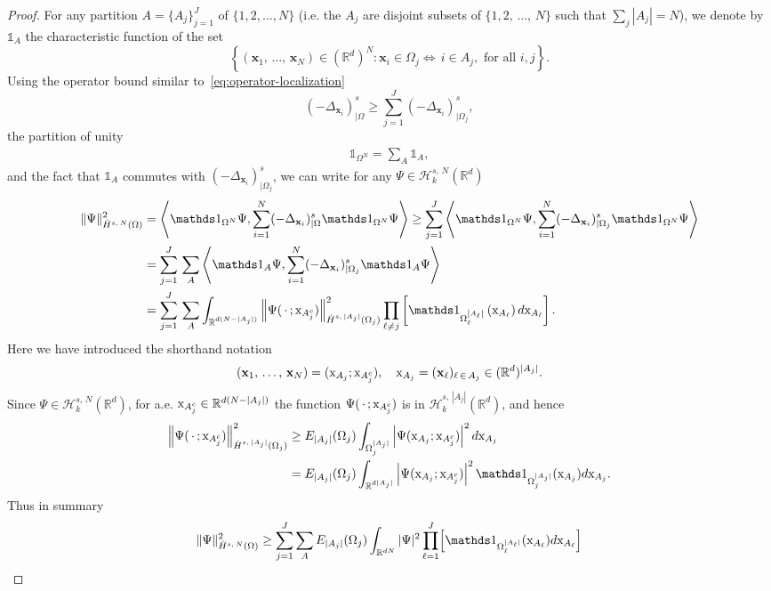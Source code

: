 \documentclass[AHL, Unicode, longabstracts, published]{cedram}
\newcommand*\R {\mathbb{R}}
\newcommand\1{{\ensuremath {\mathds 1} }}
\newcommand{\bx}{\mathbf{x}}
\newcommand{\cH}{\mathcal{H}}
\newcommand{\sx}{\textup{x}}
\begin{document}
\begin{proof}
For any partition $A=\{A_j\}_{j=1}^J$ of $\{1, 2, \ldots, N\}$ (i.e. the $A_j$ are disjoint subsets of $\{1, 2,\,\ldots,\,N\}$ such that $\sum_j |A_j|=N$), we denote by $\1_{A}$ the characteristic function of the set
\[
\left\{ (\bx_1,\,\dots,\,\bx_N) \in (\R^d)^N : \bx_i\in \Omega_j \Leftrightarrow\, i \in A_j, \text{ for all } i,j\right\}.
\]
Using the operator bound similar to~\eqref{eq:operator-localization}
\[
(-\Delta_{\bx_i})^s_{|\Omega} \ge \sum_{j=1}^J (-\Delta_{\bx_i})^s_{|\Omega_j},
\]
the partition of unity
\begin{align}\label{eq:pt-A}
\1_{\Omega^N} = \sum_{A} \1_{A},
\end{align}
and the fact that $\1_A$ commutes with $ (-\Delta_{\bx_i})^s_{|\Omega_j}$, we can write for any $\Psi\in \cH_{k}^{s,\,N}(\R^d)$
\begin{align*}
\|\Psi\|_{\dot{H}^{s,\,N}(\Omega)}^2 &= \left \langle \1_{\Omega^N}\Psi, \sum_{i=1}^N (-\Delta_{\bx_i})^s_{|\Omega} \1_{\Omega^N} \Psi \right\rangle 
\ge
\sum_{j=1}^J \left \langle \1_{\Omega^N} \Psi, \sum_{i=1}^N (-\Delta_{\bx_i})^s_{|\Omega_j} \1_{\Omega^N} \Psi\right\rangle \\
&=
\sum_{j=1}^J\,\sum_{A} \left \langle \1_A \Psi, \sum_{i=1}^N (-\Delta_{\bx_i})^s_{|\Omega_j} \1_A \Psi\right\rangle\\
&=
\sum_{j=1}^J\,\sum_{A} \int_{ \R^{d (N-|A_j|)}} \left\| \Psi(\,\cdot\,; \sx_{A_j^c}) \right\|^2_{\dot H^{s,\,|A_j|}(\Omega_j) } \prod_{\ell\ne j} \left[\1_{\Omega_\ell^{\left|A_\ell\right|}} \left(\sx_{A_\ell}\right) d \sx_{A_\ell}\right].
\end{align*}
Here we have introduced the shorthand notation
\[
(\bx_1,\,\ldots,\,\bx_N)=(\sx_{A_j};\sx_{A_j^c}), \quad \sx_{A_j}= (\bx_\ell)_{\ell\,\in\,A_j} \in (\R^{d})^{ |A_j|}.
\]
Since $\Psi\in \cH_{k}^{s,\,N}(\R^d)$, for a.e. $\sx_{A_j^c}\in \R^{d(N-|A_j|)}$ the function $\Psi(\,\cdot\,;\sx_{A_j^c})$ is in $\cH^{s,\,|A_j|}_{k}(\R^d)$, and hence
\begin{align*}
\left\| \Psi(\,\cdot\,; \sx_{A_j^c}) \right\|^2_{\dot H^{s,\,|A_j|}(\Omega_j) }&\ge
E_{|A_j|}(\Omega_j) \int_{\Omega_j^{|A_j|}} \left|\Psi(\sx_{A_j}; \sx_{A_j^c})\right|^2 d \sx_{A_j}\\
&= E_{|A_j|}(\Omega_j) \int_{\R^{d|A_j|}} \left|\Psi(\sx_{A_j}; \sx_{A_j^c})\right|^2 \1_{\Omega_j^{|A_j|}} (\sx_{A_j}) d \sx_{A_j}.
\end{align*}
Thus in summary
\begin{align*}
\|\Psi\|_{\dot{H}^{s,\,N}(\Omega)}^2 &\ge \sum_{j=1}^J \sum_{A} E_{|A_j|}(\Omega_j) \int_{ \R^{dN}} | \Psi |^2 \prod_{\ell=1}^J \Bigl[\1_{\Omega_\ell^{|A_\ell|}} (\sx_{A_\ell}) d \sx_{A_\ell} \Bigr] \\

\end{align*}
\end{proof}
\end{document}
